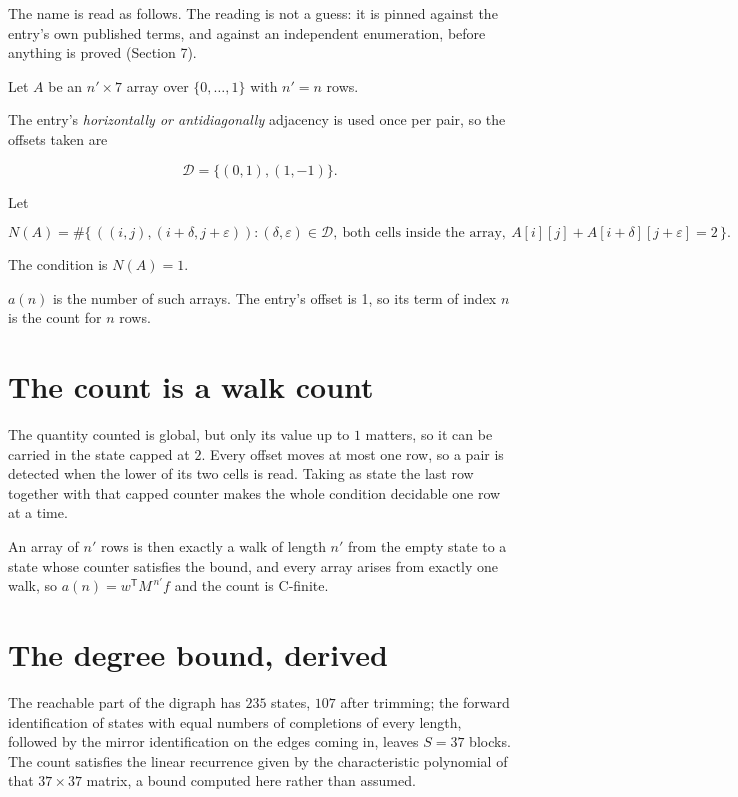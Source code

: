 \documentclass[11pt]{article}
\theoremstyle{definition}
\begin{document}
The name is read as follows. The reading is not a guess: it is pinned against the entry's own published terms, and against an independent enumeration, before anything is proved (Section 7).

Let $A$ be an $n' \times 7$ array over $\{0,\dots,1\}$ with $n' = n$ rows.

The entry's {\itshape horizontally or antidiagonally} adjacency is used once per pair, so the offsets taken are

\[\mathcal{D} = \{(0,1), (1,-1)\}.\]

Let

\[N(A) = \#\bigl\{\,((i,j),(i{+}\delta,j{+}\varepsilon)) : (\delta,\varepsilon) \in \mathcal{D},\ \text{both cells inside the array},\ A[i][j] + A[i{+}\delta][j{+}\varepsilon] = 2\,\bigr\}.\]

The condition is $N(A) = 1$.

$a(n)$ is the number of such arrays. The entry's offset is 1, so its term of index $n$ is the count for $n$ rows.

\section{The count is a walk count}

The quantity counted is global, but only its value up to $1$ matters, so it can be carried in the state capped at $2$. Every offset moves at most one row, so a pair is detected when the lower of its two cells is read. Taking as state the last row together with that capped counter makes the whole condition decidable one row at a time.

An array of $n'$ rows is then exactly a walk of length $n'$ from the empty state to a state whose counter satisfies the bound, and every array arises from exactly one walk, so $a(n) = w^{\mathsf T}M^{\,n'}f$ and the count is C-finite.

\section{The degree bound, derived}

The reachable part of the digraph has $235$ states, $107$ after trimming; the forward identification of states with equal numbers of completions of every length, followed by the mirror identification on the edges coming in, leaves $S = 37$ blocks. The count satisfies the linear recurrence given by the characteristic polynomial of that $37\times37$ matrix, a bound computed here rather than assumed.
\end{document}
